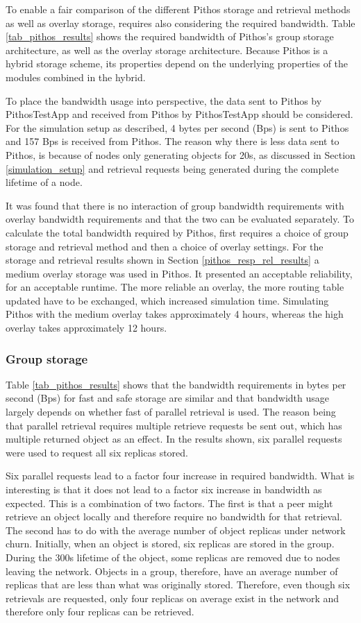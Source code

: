 To enable a fair comparison of the different Pithos storage and retrieval methods as well as overlay storage, requires also considering the required bandwidth. Table \ref{tab_pithos_results} shows the required bandwidth of Pithos's group storage architecture, as well as the overlay storage architecture. Because Pithos is a hybrid storage scheme, its properties depend on the underlying properties of the modules combined in the hybrid.

To place the bandwidth usage into perspective, the data sent to Pithos by PithosTestApp and received from Pithos by PithosTestApp should be considered. For the simulation setup as described, 4 bytes per second (Bps) is sent to Pithos and 157 Bps is received from Pithos. The reason why there is less data sent to Pithos, is because of nodes only generating objects for 20s, as discussed in Section \ref{simulation_setup} and retrieval requests being generated during the complete lifetime of a node.

It was found that there is no interaction of group bandwidth requirements with overlay bandwidth requirements and that the two can be evaluated separately. To calculate the total bandwidth required by Pithos, first requires a choice of group storage and retrieval method and then a choice of overlay settings. For the storage and retrieval results shown in Section \ref{pithos_resp_rel_results} a medium overlay storage was used in Pithos. It presented an acceptable reliability, for an acceptable runtime. The more reliable an overlay, the more routing table updated have to be exchanged, which increased simulation time. Simulating Pithos with the medium overlay takes approximately 4 hours, whereas the high overlay takes approximately 12 hours.

\subsubsection{Group storage}
Table \ref{tab_pithos_results} shows that the bandwidth requirements in bytes per second (Bps) for fast and safe storage are similar and that bandwidth usage largely depends on whether fast of parallel retrieval is used. The reason being that parallel retrieval requires multiple retrieve requests be sent out, which has multiple returned object as an effect. In the results shown, six parallel requests were used to request all six replicas stored.

Six parallel requests lead to a factor four increase in required bandwidth. What is interesting is that it does not lead to a factor six increase in bandwidth as expected. This is a combination of two factors.  The first is that a peer might retrieve an object locally and therefore require no bandwidth for that retrieval. The second has to do with the average number of object replicas under network churn. Initially, when an object is stored, six replicas are stored in the group. During the 300s lifetime of the object, some replicas are removed due to nodes leaving the network. Objects in a group, therefore, have an average number of replicas that are less than what was originally stored. Therefore, even though six retrievals are requested, only four replicas on average exist in the network and therefore only four replicas can be retrieved.

